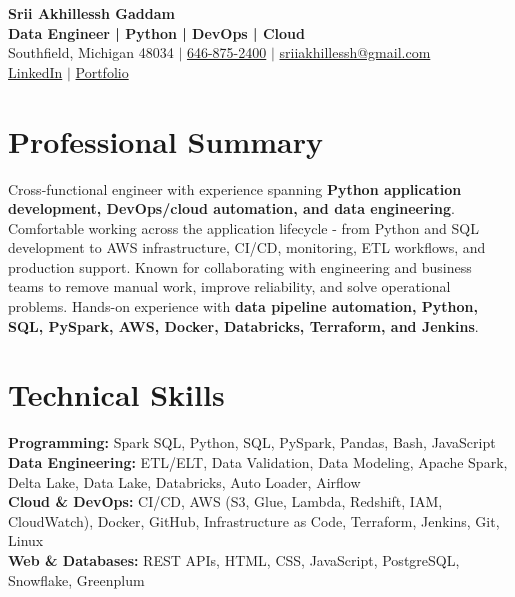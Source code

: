 \documentclass[letterpaper,10pt]{article}
\begin{document}
\fontsize{9.35pt}{10.45pt}\selectfont

\begin{center}
    {\LARGE \textbf{Srii Akhillessh Gaddam}} \\[-1pt]
    \textbf{Data Engineer | Python | DevOps | Cloud} \\[2pt]
    Southfield, Michigan 48034 $|$
    \href{tel:6468752400}{646-875-2400} $|$
    \href{mailto:sriiakhillessh@gmail.com}{sriiakhillessh@gmail.com} \\[1pt]
    \href{https://www.linkedin.com/in/srii-akhiilessh-gaddam-b48668191/}{LinkedIn} $|$
    \href{https://sriiakhillesshg.github.io/portfolio/}{Portfolio}
\end{center}
\vspace{-8pt}

\section{Professional Summary}
\small{Cross-functional engineer with experience spanning \textbf{Python application development, DevOps/cloud automation, and data engineering}. Comfortable working across the application lifecycle - from Python and SQL development to AWS infrastructure, CI/CD, monitoring, ETL workflows, and production support. Known for collaborating with engineering and business teams to remove manual work, improve reliability, and solve operational problems. Hands-on experience with \textbf{data pipeline automation, Python, SQL, PySpark, AWS, Docker, Databricks, Terraform, and Jenkins}.}

\section{Technical Skills}
\small{
\textbf{Programming:} Spark SQL, Python, SQL, PySpark, Pandas, Bash, JavaScript \\
\textbf{Data Engineering:} ETL/ELT, Data Validation, Data Modeling, Apache Spark, Delta Lake, Data Lake, Databricks, Auto Loader, Airflow \\
\textbf{Cloud \& DevOps:} CI/CD, AWS (S3, Glue, Lambda, Redshift, IAM, CloudWatch), Docker, GitHub, Infrastructure as Code, Terraform, Jenkins, Git, Linux \\
\textbf{Web \& Databases:} REST APIs, HTML, CSS, JavaScript, PostgreSQL, Snowflake, Greenplum
}
\end{document}
